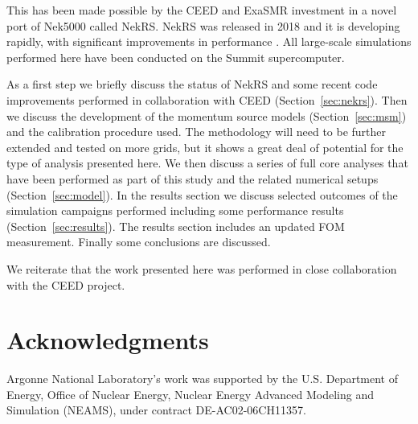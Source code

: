 \documentclass[11pt]{anlreport}
\begin{document}
This has been made possible by the CEED and ExaSMR investment in a novel port of Nek5000 called NekRS. NekRS was released in 2018 and it is developing rapidly, with significant improvements in performance \cite{merzari2020toward}. All large-scale simulations performed here have been conducted on the Summit supercomputer.

As a first step we briefly discuss the status of NekRS and some recent code improvements performed in collaboration with CEED (Section~\ref{sec:nekrs}).   Then we discuss the development of the momentum source models (Section~\ref{sec:msm}) and the calibration procedure used. The methodology will need to be further extended and tested on more grids, but it shows a great deal of potential for the type of analysis presented here. We then discuss a series of full core analyses that have been performed as part of this study and the related numerical setups (Section~\ref{sec:model}). In the results section we discuss selected outcomes of the simulation campaigns performed including some performance results (Section~\ref{sec:results}). The results section includes an updated FOM measurement. Finally some conclusions are discussed.

We reiterate  that the work presented here was performed in close collaboration with the CEED project.









\section*{Acknowledgments}

Argonne National Laboratory's work was supported by the U.S. Department of Energy, Office of Nuclear Energy, Nuclear Energy Advanced Modeling and Simulation (NEAMS), under contract DE-AC02-06CH11357.


\pagebreak




\newpage


%


\newpage
\end{document}
